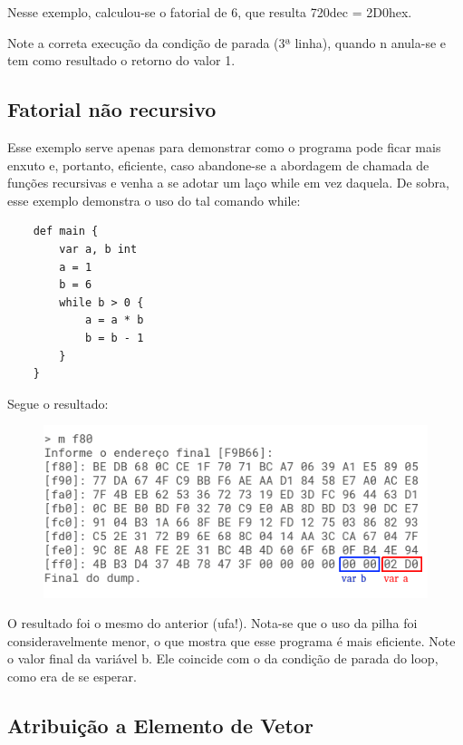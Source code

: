 \documentclass[a4paper,12pt]{report}
\begin{document}
    Nesse exemplo, calculou-se o fatorial de 6, que resulta 720dec = 2D0hex.

    Note a correta execução da condição de parada (3ª linha), quando n anula-se e tem como resultado o retorno do valor 1.
    
    \subsection*{Fatorial não recursivo}
    Esse exemplo serve apenas para demonstrar como o programa pode ficar mais enxuto e, portanto, eficiente, caso abandone-se a abordagem de chamada de funções recursivas e venha a se adotar um laço while em vez daquela. De sobra, esse exemplo demonstra o uso do tal comando while:

    \begin{lstlisting}
    def main {
        var a, b int
        a = 1
        b = 6
        while b > 0 {
            a = a * b
            b = b - 1
        }
    }
    \end{lstlisting}

    Segue o resultado:

    \begin{figure}[h]
        \centering
        \includegraphics[scale=0.65]{fat_while}
    \end{figure}

    O resultado foi o mesmo do anterior (ufa!). Nota-se que o uso da pilha foi consideravelmente menor, o que mostra que esse programa é mais eficiente. Note o valor final da variável b. Ele coincide com o da condição de parada do loop, como era de se esperar.
    
    \subsection*{Atribuição a Elemento de Vetor}
    
\end{document}
